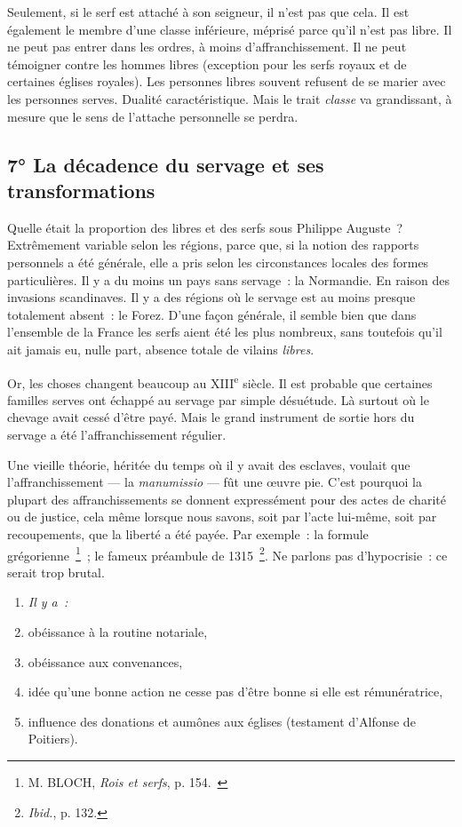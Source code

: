 \documentclass[french,twoside]{book} %
\newlength{\listmod}
\newcommand{\listhead}[1]{\hspace{-1\listmod}\emph{#1}}
\begin{document}
\noindent Seulement, si le serf est attaché à son seigneur, il n’est pas que cela. Il est également le membre d’une classe inférieure, méprisé parce qu’il n’est pas libre. Il ne peut pas entrer dans les ordres, à moins d’affranchissement. Il ne peut témoigner contre les hommes libres (exception pour les serfs royaux et de certaines églises royales). Les personnes libres souvent refusent de se marier avec les personnes serves. Dualité caractéristique. Mais le trait \emph{classe} va grandissant, à mesure que le sens de l’attache personnelle se perdra.
\subsection[{7° La décadence du servage et ses transformations}]{7° La décadence du servage et ses transformations}
\noindent Quelle était la proportion des libres et des serfs sous Philippe Auguste ? Extrêmement variable selon les régions, parce que, si la notion des rapports personnels a été générale, elle a pris selon les circonstances locales des formes particulières. Il y a du moins un pays sans servage : la Normandie. En raison des invasions scandinaves. Il y a des régions où le servage est au moins presque totalement absent : le Forez. D’une façon générale, il semble bien que dans l’ensemble de la France les serfs aient été les plus nombreux, sans toutefois qu’il ait jamais eu, nulle part, absence totale de vilains \emph{libres}.\par
Or, les choses changent beaucoup au XIII\textsuperscript{e} siècle. Il est probable que certaines familles serves ont échappé au servage par simple désuétude. Là surtout où le chevage avait cessé d’être payé. Mais le grand instrument de sortie hors du servage a été l’affranchissement régulier.\par
Une vieille théorie, héritée du temps où il y avait des esclaves, voulait que l’affranchissement — la \emph{manumissio} — fût une œuvre pie. C’est pourquoi la plupart des affranchissements se donnent expressément pour des actes de charité ou de justice, cela même lorsque nous savons, soit par l’acte lui-même, soit par recoupements, que la liberté a été payée. Par exemple : la formule grégorienne \footnote{ M. BLOCH, {\itshape Rois et serfs}, p. 154. } ; le fameux préambule de 1315 \footnote{{\itshape Ibid.}, p. 132.}. Ne parlons pas d’hypocrisie : ce serait trop brutal.\par

\begin{enumerate}[itemsep=0pt,]
\item[]\listhead{Il y a :}
\item obéissance à la routine notariale,
\item obéissance aux convenances,
\item idée qu’une bonne action ne cesse pas d’être bonne si elle est rémunératrice,
\item influence des donations et aumônes aux églises (testament d’Alfonse de Poitiers).
\end{enumerate}
\end{document}
